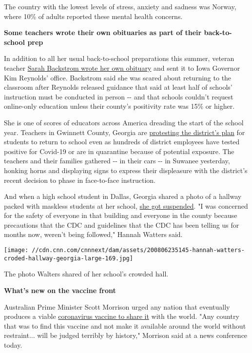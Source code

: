 The country with the lowest levels of stress, anxiety and sadness was
Norway, where 10\% of adults reported these mental health concerns.

\textbf{Some teachers wrote their own obituaries as part of their
back-to-school prep}

In addition to all her usual back-to-school preparations this summer,
veteran teacher
\href{https://cnn.com/2020/08/06/us/iowa-teachers-coronavirus-obits-trnd/index.html}{Sarah
Backstrom wrote her own obituary} and sent it to Iowa Governor Kim
Reynolds' office. Backstrom said she was scared about returning to the
classroom after Reynolds released guidance that said at least half of
schools' instruction must be conducted in person -\/- and that schools
couldn't request online-only education unless their county's positivity
rate was 15\% or higher.

She is one of scores of educators across America dreading the start of
the school year. Teachers in Gwinnett County, Georgia are
\href{https://cnn.com/2020/08/07/us/georgia-teachers-protest-return-to-school/index.html}{protesting
the district's plan} for students to return to school even as hundreds
of district employees have tested positive for Covid-19 or are in
quarantine because of potential exposure. The teachers and their
families gathered -\/- in their cars -\/- in Suwanee yesterday, honking
horns and displaying signs to express their displeasure with the
district's recent decision to phase in face-to-face instruction.

And when a high school student in Dallas, Georgia shared a photo of a
hallway packed with maskless students at her school,
\href{https://cnn.com/2020/08/07/us/georgia-teen-photo-crowded-school-hallway-trnd/index.html}{she
got suspended}. "I was concerned for the safety of everyone in that
building and everyone in the county because precautions that the CDC and
guidelines that the CDC has been telling us for months now, weren't
being followed," Hannah Watters said.

\texttt{[image: //cdn.cnn.com/cnnnext/dam/assets/200806235145-hannah-watters-croded-hallway-georgia-large-169.jpg]}

The photo Walters shared of her school's crowded hall.

\textbf{What's new on the vaccine front}

Australian Prime Minister Scott Morrison urged any nation that
eventually produces a viable
\href{https://cnn.com/world/live-news/coronavirus-pandemic-08-07-20-intl/h_ed9071aa4e540f3f320425d2f08a818e}{coronavirus
vaccine to share it} with the world. "Any country that was to find this
vaccine and not make it available around the world without restraint...
will be judged terribly by history," Morrison said at a news conference
today.

